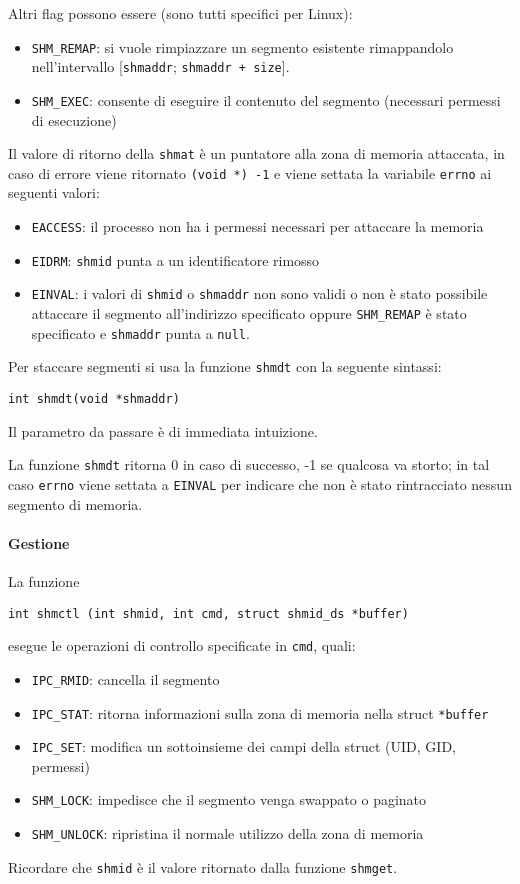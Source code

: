 \documentclass[a4paper]{article}
\begin{document}
Altri flag possono essere (sono tutti specifici per Linux):
\begin{itemize}
\item \verb|SHM_REMAP|: si vuole rimpiazzare un segmento esistente rimappandolo nell'intervallo [\verb|shmaddr|; \verb|shmaddr + size|].
\item \verb|SHM_EXEC|: consente di eseguire il contenuto del segmento (necessari permessi di esecuzione)
\end{itemize}

Il valore di ritorno della \verb|shmat| è un puntatore alla zona di memoria attaccata, in caso di errore viene ritornato \verb|(void *) -1| e viene settata la variabile \verb|errno| ai seguenti valori:
\begin{itemize}
\item \verb|EACCESS|: il processo non ha i permessi necessari per attaccare la memoria
\item \verb|EIDRM|: \verb|shmid| punta a un identificatore rimosso
\item \verb|EINVAL|: i valori di \verb|shmid| o \verb|shmaddr| non sono validi o non è stato possibile attaccare il segmento all'indirizzo specificato oppure \verb|SHM_REMAP| è stato specificato e \verb|shmaddr| punta a \verb|null|.
\end{itemize}

Per staccare segmenti si usa la funzione \verb|shmdt| con la seguente sintassi:
\begin{verbatim}
int shmdt(void *shmaddr)
\end{verbatim}
Il parametro da passare è di immediata intuizione.

La funzione \verb|shmdt| ritorna 0 in caso di successo, -1 se qualcosa va storto; in tal caso \verb|errno| viene settata a \verb|EINVAL| per indicare che non è stato rintracciato nessun segmento di memoria.

\paragraph{Gestione}
La funzione
\begin{verbatim}
int shmctl (int shmid, int cmd, struct shmid_ds *buffer)
\end{verbatim}
esegue le operazioni di controllo specificate in \verb|cmd|, quali:
\begin{itemize}
\item \verb|IPC_RMID|: cancella il segmento
\item \verb|IPC_STAT|: ritorna informazioni sulla zona di memoria nella struct \verb|*buffer|
\item \verb|IPC_SET|: modifica un sottoinsieme dei campi della struct (UID, GID, permessi)
\item \verb|SHM_LOCK|: impedisce che il segmento venga swappato o paginato
\item \verb|SHM_UNLOCK|: ripristina il normale utilizzo della zona di memoria
\end{itemize}
Ricordare che \verb|shmid| è il valore ritornato dalla funzione \verb|shmget|. \\
\end{document}
